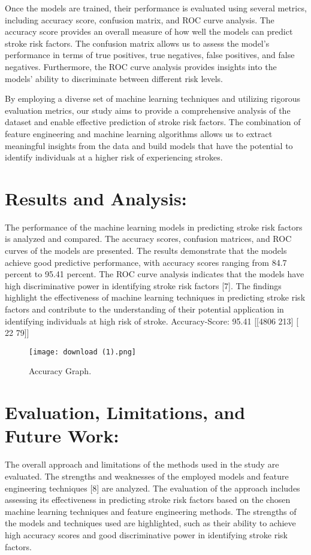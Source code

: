 \documentclass{article}
\begin{document}
Once the models are trained, their performance is evaluated using several metrics, including accuracy score, confusion matrix, and ROC curve analysis. The accuracy score provides an overall measure of how well the models can predict stroke risk factors. The confusion matrix allows us to assess the model's performance in terms of true positives, true negatives, false positives, and false negatives. Furthermore, the ROC curve analysis provides insights into the models' ability to discriminate between different risk levels.

By employing a diverse set of machine learning techniques and utilizing rigorous evaluation metrics, our study aims to provide a comprehensive analysis of the dataset and enable effective prediction of stroke risk factors. The combination of feature engineering and machine learning algorithms allows us to extract meaningful insights from the data and build models that have the potential to identify individuals at a higher risk of experiencing strokes.

\section{Results and Analysis:}

The performance of the machine learning models in predicting stroke risk factors is analyzed and compared. The accuracy scores, confusion matrices, and ROC curves of the models are presented. The results demonstrate that the models achieve good predictive performance, with accuracy scores ranging from 84.7 percent to 95.41 percent. The ROC curve analysis indicates that the models have high discriminative power in identifying stroke risk factors [7]. The findings highlight the effectiveness of machine learning techniques in predicting stroke risk factors and contribute to the understanding of their potential application in identifying individuals at high risk of stroke.
Accuracy-Score: 95.41%
[[4806  213]
 [  22   79]]


\begin{figure}
\centering
\texttt{[image: download (1).png]}
\caption{\label{fig:frog} Accuracy Graph.}
\end{figure}



\section{Evaluation, Limitations, and Future Work:}
The overall approach and limitations of the methods used in the study are evaluated. The strengths and weaknesses of the employed models and feature engineering techniques [8] are analyzed. The evaluation of the approach includes assessing its effectiveness in predicting stroke risk factors based on the chosen machine learning techniques and feature engineering methods. The strengths of the models and techniques used are highlighted, such as their ability to achieve high accuracy scores and good discriminative power in identifying stroke risk factors.
\end{document}
